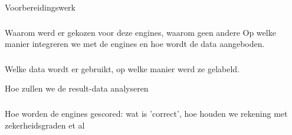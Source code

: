 
\chapter{}
\label{ch:methodologie}

\section{}
\label{sec:methodologie-inleiding}

\section{}
\label{sec:fase-1}
Voorbereidingswerk

\subsection{}
\label{sec:keuze-van-computer-vision-engines}
Waarom werd er gekozen voor deze engines, waarom geen andere
Op welke manier integreren we met de engines en hoe wordt de data aangeboden.

\subsection{}
\label{sec:methodologie-data}
Welke data wordt er gebruikt, op welke manier werd ze gelabeld.

Hoe zullen we de result-data analyseren

\subsection{}
\label{sec:scoren-van-engines}
Hoe worden de engines gescored: wat is 'correct', hoe houden we rekening met zekerheidsgraden et al

